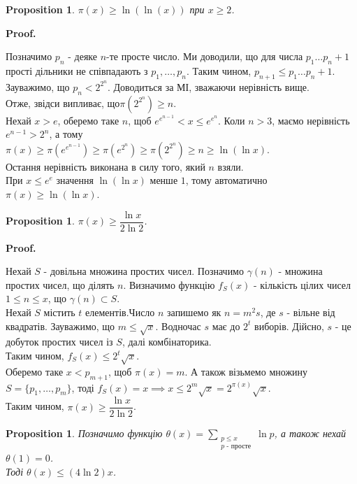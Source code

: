 \documentclass[a4paper, 14pt]{extarticle}
\makeatletter
\theoremstyle{theoremdd}
\theoremstyle{theoremdd}
\theoremstyle{theoremdd}
\theoremstyle{theoremdd}
\theoremstyle{theoremdd}
\newtheorem{proposition}[theorem]{Proposition}
\theoremstyle{theoremdd}
\theoremstyle{theoremdd}
\theoremstyle{theoremdd}
\def\qed{$\blacksquare$}
\renewenvironment{proof}[1][Proof.\\]{\par
\pushQED{\hfill \qed}%
\normalfont \topsep6\p@\@plus6\p@\relax
\trivlist
\item\relax
{\bfseries
#1\@addpunct{.}}\hspace\labelsep\ignorespaces
}{%
\popQED\endtrivlist\@endpefalse
}
\makeatother
\begin{document}
\begin{proposition}
$\pi(x) \geq \ln (\ln(x))$ при $x \geq 2$.
\end{proposition}

\begin{proof}
Позначимо $p_n$ - деяке $n$-те просте число. Ми доводили, що для числа $p_1 \dots p_n + 1$ прості дільники не співпадають з $p_1,\dots,p_n$. Таким чином, $p_{n+1} \leq p_1 \dots p_n + 1$.\\
Зауважимо, що $p_n < 2^{2^n}$. Доводиться за МІ, зважаючи нерівність вище.\\
Отже, звідси випливає, що$\pi\left(2^{2^n}\right) \geq n$.\\
Нехай $x > e$, оберемо таке $n$, щоб $e^{e^{n-1}} < x \leq e^{e^n}$. Коли $n > 3$, маємо нерівність $e^{n-1} > 2^n$, а тому\\
$\pi(x) \geq \pi\left(e^{e^{n-1}}\right) \geq \pi\left( e^{2^n}\right) \geq \pi\left( 2^{2^n}\right) \geq n \geq \ln (\ln x)$.\\
Остання нерівність виконана в силу того, який $n$ взяли.\\
При $x \leq e^e$ значення $\ln(\ln x)$ менше $1$, тому автоматично $\pi(x) \geq \ln (\ln x)$.
\end{proof}

\begin{proposition}
$\pi(x) \geq \dfrac{\ln x}{2 \ln 2}$.
\end{proposition}

\begin{proof}
Нехай $S$ - довільна множина простих чисел. Позначимо $\gamma(n)$ - множина простих чисел, що ділять $n$. Визначимо функцію $f_S(x)$ - кількість цілих чисел $1 \leq n \leq x$, що $\gamma(n) \subset S$.\\
Нехай $S$ містить $t$ елементів.Число $n$ запишемо як $n = m^2s$, де $s$ - вільне від квадратів. Зауважимо, що $m \leq \sqrt{x}$. Водночас $s$ має до $2^t$ виборів. Дійсно, $s$ - це добуток простих чисел із $S$, далі комбінаторика.\\
Таким чином, $f_S(x) \leq 2^t \sqrt{x}$.\\
Оберемо таке $x < p_{m+1}$, щоб $\pi(x) = m$. А також візьмемо множину $S = \{p_1,\dots,p_m\}$, тоді $f_S(x) = x \implies x \leq 2^m \sqrt{x} = 2^{\pi(x)} \sqrt{x}$.\\
Таким чином, $\pi(x) \geq \dfrac{\ln x}{2 \ln 2}$.
\end{proof}

\begin{proposition}
Позначимо функцію $\theta(x) = \displaystyle\sum_{\substack{p \leq x \\ p \text{ - просте}}} \ln p$, а також нехай $\theta(1) = 0$.\\
Тоді $\theta(x) \leq (4 \ln 2) x$.
\end{proposition}
\end{document}
